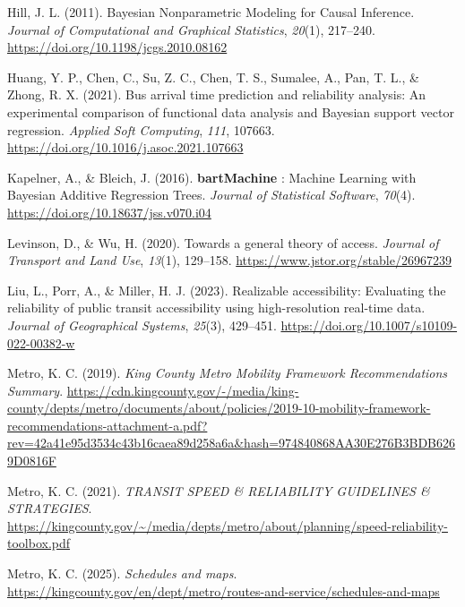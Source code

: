 \documentclass[
  12pt,
]{article}
\newlength{\cslhangindent}
\newenvironment{CSLReferences}[2] %
 {\begin{list}{}{%
  \setlength{\itemindent}{0pt}
  \setlength{\leftmargin}{0pt}
  \setlength{\parsep}{0pt}
  \ifodd #1
   \setlength{\leftmargin}{\cslhangindent}
   \setlength{\itemindent}{-1\cslhangindent}
  \fi
  \setlength{\itemsep}{#2\baselineskip}}}
 {\end{list}}
\begin{document}
\begin{CSLReferences}{1}{0}
Hill, J. L. (2011). Bayesian {Nonparametric} {Modeling} for {Causal}
{Inference}. \emph{Journal of Computational and Graphical Statistics},
\emph{20}(1), 217--240. \url{https://doi.org/10.1198/jcgs.2010.08162}

Huang, Y. P., Chen, C., Su, Z. C., Chen, T. S., Sumalee, A., Pan, T. L.,
\& Zhong, R. X. (2021). Bus arrival time prediction and reliability
analysis: {An} experimental comparison of functional data analysis and
{Bayesian} support vector regression. \emph{Applied Soft Computing},
\emph{111}, 107663. \url{https://doi.org/10.1016/j.asoc.2021.107663}

Kapelner, A., \& Bleich, J. (2016). \textbf{bartMachine} : {Machine}
{Learning} with {Bayesian} {Additive} {Regression} {Trees}.
\emph{Journal of Statistical Software}, \emph{70}(4).
\url{https://doi.org/10.18637/jss.v070.i04}

Levinson, D., \& Wu, H. (2020). Towards a general theory of access.
\emph{Journal of Transport and Land Use}, \emph{13}(1), 129--158.
\url{https://www.jstor.org/stable/26967239}

Liu, L., Porr, A., \& Miller, H. J. (2023). Realizable accessibility:
Evaluating the reliability of public transit accessibility using
high-resolution real-time data. \emph{Journal of Geographical Systems},
\emph{25}(3), 429--451. \url{https://doi.org/10.1007/s10109-022-00382-w}

Metro, K. C. (2019). \emph{King {County} {Metro} {Mobility} {Framework}
{Recommendations} {Summary}}.
\url{https://cdn.kingcounty.gov/-/media/king-county/depts/metro/documents/about/policies/2019-10-mobility-framework-recommendations-attachment-a.pdf?rev=42a41e95d3534c43b16caea89d258a6a&hash=974840868AA30E276B3BDB6269D0816F}

Metro, K. C. (2021). \emph{{TRANSIT} {SPEED} \& {RELIABILITY}
{GUIDELINES} \& {STRATEGIES}}.
\url{https://kingcounty.gov/~/media/depts/metro/about/planning/speed-reliability-toolbox.pdf}

Metro, K. C. (2025). \emph{Schedules and maps}.
\url{https://kingcounty.gov/en/dept/metro/routes-and-service/schedules-and-maps}


\end{CSLReferences}
\end{document}
